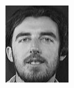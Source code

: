 \begin{frame}
\begin{columns}
\begin{overlayarea}{\textwidth}{\textheight}
      \begin{minipage}[t]{0.15\textwidth}
        \includegraphics[width=\textwidth]{images/celebrity_images/s11_1.jpg}
      \end{minipage}
      \begin{minipage}[t]{0.15\textwidth}

\end{minipage}
\end{overlayarea}
\end{columns}
\end{frame}
